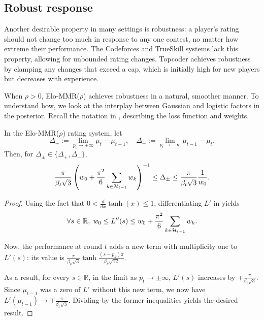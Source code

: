 \subsection{Robust response}
\label{sec:robust}

Another desirable property in many settings is robustness: a player's rating should not change too much in response to any one contest, no matter how extreme their performance. The Codeforces and TrueSkill systems lack this property, allowing for unbounded rating changes. Topcoder achieves robustness by clamping any changes that exceed a cap, which is initially high for new players but decreases with experience.

When $\rho>0$, Elo-MMR($\rho$) achieves robustness in a natural, smoother manner. To understand how, we look at the interplay between Gaussian and logistic factors in the posterior. Recall the notation in , describing the loss function and weights.

\begin{theorem}
\label{thm:robust}
In the Elo-MMR($\rho$) rating system, let
\[\Delta_+ := \lim_{p_t\rightarrow+\infty} \mu_{t}-\mu_{t-1},
\quad\Delta_- := \lim_{p_t\rightarrow-\infty}\mu_{t-1}-\mu_{t}.
\]
Then, for $\Delta_\pm \in \{\Delta_+, \Delta_-\}$,
\[\frac{\pi}{\beta_t\sqrt 3}
\left(w_0 + \frac{\pi^2}{6}\sum_{k\in{\mathcal{H}}_{t-1}}w_k \right)^{-1}
\le \Delta_\pm
\le \frac{\pi}{\beta_t\sqrt 3}\frac{1}{w_0}.\]
\end{theorem}

\begin{proof}
Using the fact that $0 < \frac{d}{dx}\tanh(x) \le 1$, differentiating $L'$ in  yields
\[\forall s\in\mathbb R,\; w_0 \le L''(s)
\le w_0 + \frac{\pi^2}{6}\sum_{k\in{\mathcal{H}}_{t-1}}w_k.\]

Now, the performance at round $t$ adds a new term with multiplicity one to $L'(s)$: its value is
$\frac{\pi}{\beta_k\sqrt{3}} \tanh \frac{(s-p_k)\pi}{\beta_k\sqrt{12}}$.

As a result, for every $s\in\mathbb R$, in the limit as $p_t\rightarrow\pm\infty$, $L'(s)$ increases by $\mp\frac{\pi}{\beta_t\sqrt 3}$. Since $\mu_{t-1}$ was a zero of $L'$ without this new term, we now have
$L'(\mu_{t-1}) \rightarrow \mp\frac{\pi}{\beta_t\sqrt 3}.$ Dividing by the former inequalities yields the desired result.
\end{proof}


